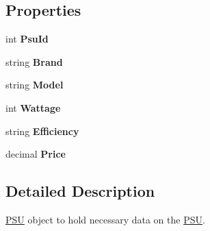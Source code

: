 \subsection*{Properties}
\begin{DoxyCompactItemize}
\item 
int {\bfseries Psu\+Id}\hypertarget{class_business_objects_1_1_p_s_u_ab1c703d2846b1b7a0bd1c62f918aabef}{}\label{class_business_objects_1_1_p_s_u_ab1c703d2846b1b7a0bd1c62f918aabef}

\item 
string {\bfseries Brand}\hypertarget{class_business_objects_1_1_p_s_u_a21529fd3e98dcae4c9b169d3324a083b}{}\label{class_business_objects_1_1_p_s_u_a21529fd3e98dcae4c9b169d3324a083b}

\item 
string {\bfseries Model}\hypertarget{class_business_objects_1_1_p_s_u_a61151c4df983466da3f88f255bfab7b8}{}\label{class_business_objects_1_1_p_s_u_a61151c4df983466da3f88f255bfab7b8}

\item 
int {\bfseries Wattage}\hypertarget{class_business_objects_1_1_p_s_u_a9daaba69d8ef52adeb86bc89d0aa6a4d}{}\label{class_business_objects_1_1_p_s_u_a9daaba69d8ef52adeb86bc89d0aa6a4d}

\item 
string {\bfseries Efficiency}\hypertarget{class_business_objects_1_1_p_s_u_a10bfc5e78c2ef86a33b947dd1578aae2}{}\label{class_business_objects_1_1_p_s_u_a10bfc5e78c2ef86a33b947dd1578aae2}

\item 
decimal {\bfseries Price}\hypertarget{class_business_objects_1_1_p_s_u_a9384364baec19b5b9205133831945c2e}{}\label{class_business_objects_1_1_p_s_u_a9384364baec19b5b9205133831945c2e}

\end{DoxyCompactItemize}


\subsection{Detailed Description}
\hyperlink{class_business_objects_1_1_p_s_u}{P\+SU} object to hold necessary data on the \hyperlink{class_business_objects_1_1_p_s_u}{P\+SU}. 



